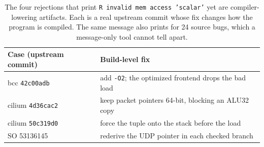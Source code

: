 \begin{table}[t]
  \centering
  \caption{The four \empiricalset rejections that print \texttt{R invalid mem access 'scalar'} yet are compiler-lowering artifacts. Each is a real upstream commit whose fix changes how the program is compiled. The same message also prints for 24 source bugs, which a message-only tool cannot tell apart.}
  \label{tab:lowering}
  \small
  \begin{tabular}{@{}l p{4.6cm}@{}}
    \toprule
    Case (upstream commit) & Build-level fix \\
    \midrule
    bcc \texttt{42c00adb}    & add \texttt{-O2}; the optimized frontend drops the bad load \\
    cilium \texttt{4d36cac2} & keep packet pointers 64-bit, blocking an ALU32 copy \\
    cilium \texttt{50c319d0} & force the tuple onto the stack before the load \\
    SO 53136145              & rederive the UDP pointer in each checked branch \\
    \bottomrule
  \end{tabular}
\end{table}
